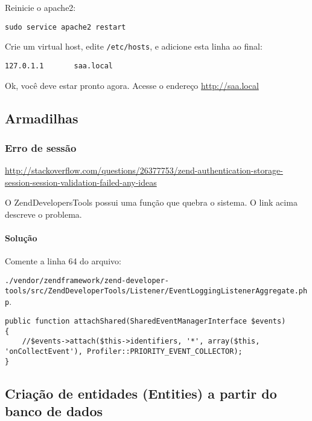 Reinicie o apache2:

\begin{verbatim}
sudo service apache2 restart
\end{verbatim}

Crie um virtual host, edite \texttt{/etc/hosts}, e adicione esta linha
ao final:

\begin{verbatim}
127.0.1.1       saa.local
\end{verbatim}

Ok, você deve estar pronto agora. Acesse o endereço
\url{http://saa.local}

\subsection{Armadilhas}\label{armadilhas}

\subsubsection{Erro de sessão}\label{erro-de-sessuxe3o}

\url{http://stackoverflow.com/questions/26377753/zend-authentication-storage-session-session-validation-failed-any-ideas}

O ZendDevelopersTools possui uma função que quebra o sistema. O link
acima descreve o problema.

\paragraph{Solução}\label{soluuxe7uxe3o}

Comente a linha 64 do arquivo:

\texttt{./vendor/zendframework/zend-developer-tools/src/ZendDeveloperTools/Listener/EventLoggingListenerAggregate.php}.

\begin{verbatim}
public function attachShared(SharedEventManagerInterface $events)
{
    //$events->attach($this->identifiers, '*', array($this, 'onCollectEvent'), Profiler::PRIORITY_EVENT_COLLECTOR);
}
\end{verbatim}

\subsection{Criação de entidades (Entities) a partir do banco de
dados}\label{criauxe7uxe3o-de-entidades-entities-a-partir-do-banco-de-dados}

